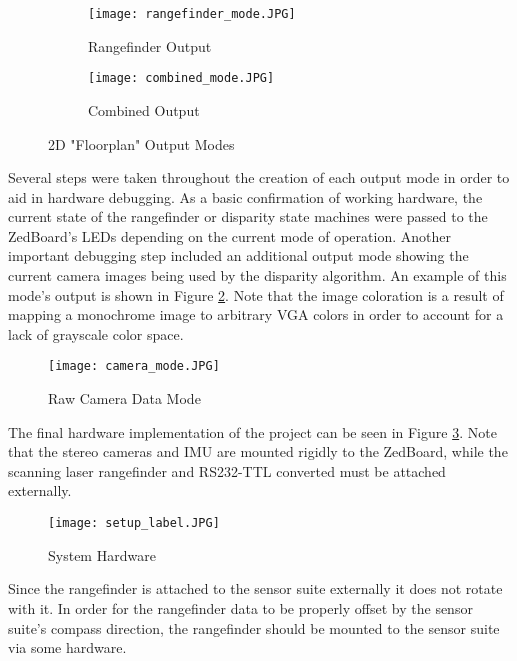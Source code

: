 \begin{figure}[H] 
         \begin{subfigure}[h]{0.5\textwidth}
              \centerline{\texttt{[image: rangefinder\_mode.JPG]}}
             \caption{Rangefinder Output}
         \end{subfigure}
         \begin{subfigure}[h]{0.5\textwidth}
             \centerline{\texttt{[image: combined\_mode.JPG]}}
             \caption{Combined Output}
         \end{subfigure}
\caption{2D "Floorplan" Output Modes}
\label{rangeOutputs}
\end{figure}
\par 
Several steps were taken throughout the creation of each output mode in order to aid in hardware debugging. As a basic confirmation of working hardware, the current state of the rangefinder or disparity state machines were passed to the ZedBoard's LEDs depending on the current mode of operation. Another important debugging step included an additional output mode showing the current camera images being used by the disparity algorithm. An example of this mode's output is shown in Figure \ref{camOutMode}. Note that the image coloration is a result of mapping a monochrome image to arbitrary VGA colors in order to account for a lack of grayscale color space. 
\begin{figure}[H]  
 	\centerline{
	\texttt{[image: camera\_mode.JPG]}
	}
	\caption{Raw Camera Data Mode}
	\label{camOutMode}
\end{figure} 

The final hardware implementation of the project can be seen in Figure \ref{finalHW}. Note that the stereo cameras and IMU are mounted rigidly to the ZedBoard, while the scanning laser rangefinder and RS232-TTL converted must be attached externally. 

\par\null\par
\begin{figure}[H]  
 	\centerline{
	\texttt{[image: setup\_label.JPG]}
	}
	\caption{System Hardware}
	\label{finalHW}
\end{figure}

Since the rangefinder is attached to the sensor suite externally it does not rotate with it. In order for the rangefinder data to be properly offset by the sensor suite's compass direction, the rangefinder should be mounted to the sensor suite via some hardware.



